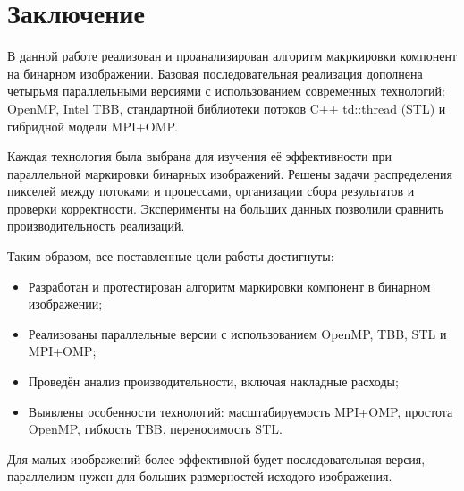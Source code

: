 \documentclass[12pt]{extarticle}
\begin{document}
\newpage
\section{Заключение}

\hspace*{1.25em}В данной работе реализован и проанализирован алгоритм макркировки компонент на бинарном изображении. Базовая последовательная реализация дополнена четырьмя параллельными версиями с использованием современных технологий: OpenMP, Intel TBB, стандартной библиотеки потоков C++ td::thread (STL) и гибридной модели MPI+OMP.

Каждая технология была выбрана для изучения её эффективности при параллельной маркировки бинарных изображений. Решены задачи распределения пикселей между потоками и процессами, организации сбора результатов и проверки корректности. Эксперименты на больших данных позволили сравнить производительность реализаций.



Таким образом, все поставленные цели работы достигнуты: \\[-0.9cm]
\begin{itemize}
  \item Разработан и протестирован алгоритм маркировки компонент в бинарном изображении; \\[-0.9cm]
  \item Реализованы параллельные версии с использованием OpenMP, TBB, STL и MPI+OMP; \\[-0.9cm]
  \item Проведён анализ производительности, включая накладные расходы; \\[-0.9cm]
  \item Выявлены особенности технологий: масштабируемость MPI+OMP, простота OpenMP, гибкость TBB, переносимость STL. \\[-0.9cm]
\end{itemize}

Для малых изображений более эффективной будет последовательная версия, параллелизм нужен для больших размерностей исходого изображения.

\newpage
\end{document}
